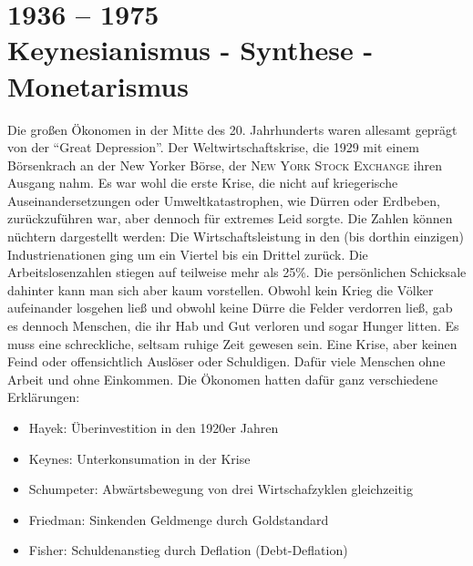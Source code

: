 %
%
%


\part{1936 -- 1975\\Keynesianismus - Synthese - Monetarismus}

Die großen Ökonomen in der Mitte des 20. Jahrhunderts waren allesamt geprägt von der "`Great Depression"'. Der Weltwirtschaftskrise, die 1929 mit einem Börsenkrach an der New Yorker Börse, der \textsc{New York Stock Exchange} ihren Ausgang nahm. Es war wohl die erste Krise, die nicht auf kriegerische Auseinandersetzungen oder Umweltkatastrophen, wie Dürren oder Erdbeben, zurückzuführen war, aber dennoch für extremes Leid sorgte. Die Zahlen können nüchtern dargestellt werden: Die Wirtschaftsleistung in den (bis dorthin einzigen) Industrienationen ging um ein Viertel bis ein Drittel zurück. Die Arbeitslosenzahlen stiegen auf teilweise mehr als 25\%. Die persönlichen Schicksale dahinter kann man sich aber kaum vorstellen. Obwohl kein Krieg die Völker aufeinander losgehen ließ und obwohl keine Dürre die Felder verdorren ließ, gab es dennoch Menschen, die ihr Hab und Gut verloren und sogar Hunger litten. Es muss eine schreckliche, seltsam ruhige Zeit gewesen sein. Eine Krise, aber keinen Feind oder offensichtlich Auslöser oder Schuldigen. Dafür viele Menschen ohne Arbeit und ohne Einkommen.
Die Ökonomen hatten dafür ganz verschiedene Erklärungen:
\begin{itemize}
	\item Hayek: Überinvestition in den 1920er Jahren
	\item Keynes: Unterkonsumation in der Krise
	\item Schumpeter: Abwärtsbewegung von drei Wirtschafzyklen gleichzeitig
	\item Friedman: Sinkenden Geldmenge durch Goldstandard
	\item Fisher: Schuldenanstieg durch Deflation (Debt-Deflation)
\end{itemize}
